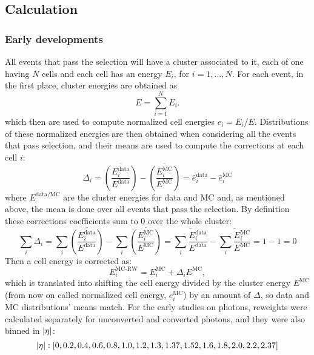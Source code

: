 \subsection{Calculation}
\label{subsec:ss_corrections:cell_rw:calculation}

\subsubsection{Early developments}
\label{subsubsec:ss_corrections:cell_rw:calculation:previous}

All events that pass the selection will have a cluster associated to it, each of one having \(N\) cells and each cell has an energy \(E_i\), for \(i=1,\dots,N\). For each event, in the first place, cluster energies are obtained as
\begin{equation*}
    E = \sum_{i=1}^{N} E_i.
\end{equation*}
which then are used to compute normalized cell energies \(e_i = E_i/E\). Distributions of these normalized energies are then obtained when considering all the events that pass selection, and their means are used to compute the corrections at each cell \(i\):
\begin{equation}
    \label{eq:ss_corrections:cell_rw:calculation:previous:old_corrections}
    \Delta_i = \overline{\left( \frac{ E_i^{\text{data}} }{ E^{\text{data}} } \right)} - \overline{\left( \frac{ E_i^{\text{MC}} }{ E^{\text{MC}} } \right)}
    = \bar e_i^{\text{data}} - \bar e_i^{\text{MC}}
\end{equation}
where \(E^{\text{data/MC}}\) are the cluster energies for data and \ac{MC} and, as mentioned above, the mean is done over all events that pass the selection. By definition these corrections coefficients sum to 0 over the whole cluster:
\begin{equation*}
    \sum_i \Delta_i = \sum_i \overline{\left( \frac{ E_i^{\text{data}} }{ E^{\text{data}} } \right)} - \sum_i \overline{\left( \frac{ E_i^{\text{MC}} }{ E^{\text{MC}} } \right)}
    = \overline{\sum_i \frac{ E_i^{\text{data}} }{ E^{\text{data}} }} - \overline{\sum_i \frac{ E_i^{\text{MC}} }{ E^{\text{MC}} }}
    = 1 - 1 = 0
\end{equation*}
Then a cell energy is corrected as:
\begin{equation}
    \label{eq:ss_corrections:cell_rw:calculation:previous:correction_method}
    E_i^{\text{MC-RW}} = E_i^{\text{MC}} + \Delta_i E^{\text{MC}},
\end{equation}
which is translated into shifting the cell energy divided by the cluster energy \(E^{\text{MC}}\) (from now on called normalized cell energy, \(e_i^{\text{MC}}\)) by an amount of \(\Delta\), so data and \ac{MC} distributions' means match. For the early studies on photons, reweights were calculated separately for unconverted and converted photons, and they were also binned in \(|\eta|\):
\[
    |\eta|: [0, 0.2, 0.4, 0.6, 0.8, 1.0, 1.2, 1.3, 1.37, 1.52, 1.6, 1.8, 2.0, 2.2, 2.37]
\]

